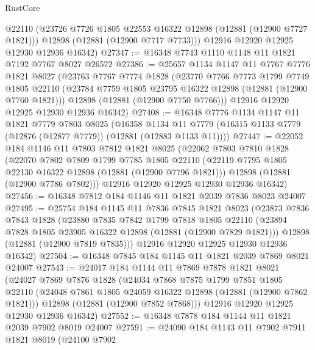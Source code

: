 \begin{lexlean}{RustCore}
\begin{coremodule}
        @22110
        (@23726 @7726 @1805 @22553 @16322 @12898 (@12881 (@12900 @7727 @1821)))
        @12898
        (@12881 (@12900 @7717 @7733)))
      @12916
      @12920
      @12925
      @12930
      @12936
      @16342)
@27347 := @16348 @7743 @1110 @1148 @11 @1821 @7192 @7767 @8027 @26572
@27386 := @25657
    @1134
    @1147
    @11
    @7767
    @7776
    @1821
    @8027
    (@23763
      @7767
      @7774
      @1828
      (@23770
        @7766
        @7773
        @1799
        @7749
        @1805
        @22110
        (@23784 @7759 @1805 @23795 @16322 @12898 (@12881 (@12900 @7760 @1821)))
        @12898
        (@12881 (@12900 @7750 @7766)))
      @12916
      @12920
      @12925
      @12930
      @12936
      @16342)
@27408 := @16348
    @7776
    @1134
    @1147
    @11
    @1821
    @7779
    @7803
    @8025
    (@16358
      @1134
      @11
      @7779
      (@16315 @1133 @7779 (@12876 (@12877 @7779)) (@12881 (@12883 @1133 @11))))
@27447 := @22052
    @184
    @1146
    @11
    @7803
    @7812
    @1821
    @8025
    (@22062
      @7803
      @7810
      @1828
      (@22070
        @7802
        @7809
        @1799
        @7785
        @1805
        @22110
        (@22119 @7795 @1805 @22130 @16322 @12898 (@12881 (@12900 @7796 @1821)))
        @12898
        (@12881 (@12900 @7786 @7802)))
      @12916
      @12920
      @12925
      @12930
      @12936
      @16342)
@27456 := @16348 @7812 @184 @1146 @11 @1821 @2039 @7836 @8023 @24007
@27495 := @25754
    @184
    @1145
    @11
    @7836
    @7845
    @1821
    @8023
    (@23873
      @7836
      @7843
      @1828
      (@23880
        @7835
        @7842
        @1799
        @7818
        @1805
        @22110
        (@23894 @7828 @1805 @23905 @16322 @12898 (@12881 (@12900 @7829 @1821)))
        @12898
        (@12881 (@12900 @7819 @7835)))
      @12916
      @12920
      @12925
      @12930
      @12936
      @16342)
@27504 := @16348 @7845 @184 @1145 @11 @1821 @2039 @7869 @8021 @24007
@27543 := @24017
    @184
    @1144
    @11
    @7869
    @7878
    @1821
    @8021
    (@24027
      @7869
      @7876
      @1828
      (@24034
        @7868
        @7875
        @1799
        @7851
        @1805
        @22110
        (@24048 @7861 @1805 @24059 @16322 @12898 (@12881 (@12900 @7862 @1821)))
        @12898
        (@12881 (@12900 @7852 @7868)))
      @12916
      @12920
      @12925
      @12930
      @12936
      @16342)
@27552 := @16348 @7878 @184 @1144 @11 @1821 @2039 @7902 @8019 @24007
@27591 := @24090
    @184
    @1143
    @11
    @7902
    @7911
    @1821
    @8019
    (@24100
      @7902

\end{coremodule}
\end{lexlean}
